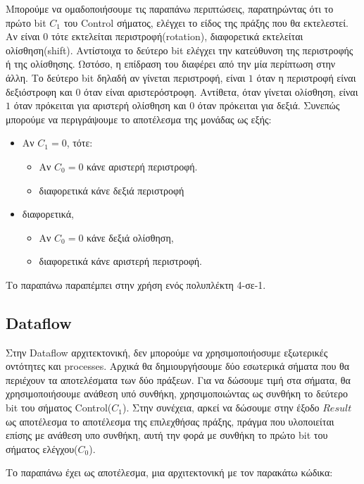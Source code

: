 \documentclass[11pt, a4paper]{report}
\begin{document}
Μπορούμε να ομαδοποιήσουμε τις παραπάνω περιπτώσεις, παρατηρώντας ότι το πρώτο bit $C_1$ του Control σήματος, ελέγχει το είδος της πράξης που θα εκτελεστεί.
Αν είναι $0$ τότε εκτελείται περιστροφή(rotation), διαφορετικά εκτελείται ολίσθηση(shift).
Αντίστοιχα το δεύτερο bit ελέγχει την κατεύθυνση της περιστροφής ή της ολίσθησης. Ωστόσο, η επίδραση του διαφέρει από την μία περίπτωση στην άλλη.
Το δεύτερο bit δηλαδή αν γίνεται περιστροφή, είναι $1$ όταν η περιστροφή είναι δεξιόστροφη και $0$ όταν είναι αριστερόστροφη.
Αντίθετα, όταν γίνεται ολίσθηση, είναι $1$ όταν πρόκειται για αριστερή ολίσθηση και $0$ όταν πρόκειται για δεξιά.
Συνεπώς μπορούμε να περιγράψουμε το αποτέλεσμα της μονάδας ως εξής:
\begin{itemize}
  \item Αν $C_1 = 0$, τότε:
    \begin{itemize}
      \item Αν $C_0 = 0$ κάνε αριστερή περιστροφή.
      \item διαφορετικά κάνε δεξιά περιστροφή
    \end{itemize}
  \item διαφορετικά,
    \begin{itemize}
      \item Αν $C_0 = 0$ κάνε δεξιά ολίσθηση,
      \item διαφορετικά κάνε αριστερή περιστροφή.
    \end{itemize}
\end{itemize}

Το παραπάνω παραπέμπει στην χρήση ενός πολυπλέκτη 4-σε-1.

\subsection{Dataflow}
Στην Dataflow αρχιτεκτονική, δεν μπορούμε να χρησιμοποιήοσυμε εξωτερικές οντότητες και processes.
Αρχικά θα δημιουργήσουμε δύο εσωτερικά σήματα που θα περιέχουν τα αποτελέσματα των δύο πράξεων.
Για να δώσουμε τιμή στα σήματα, θα χρησιμοποιήσουμε ανάθεση υπό συνθήκη, χρησιμοποιώντας ως συνθήκη το δεύτερο bit του σήματος Control($C_1$).
Στην συνέχεια, αρκεί να δώσουμε στην έξοδο $Result$ ως αποτέλεσμα το αποτέλεσμα της επιλεχθήσας πράξης, πράγμα που υλοποιείται επίσης με ανάθεση υπο συνθήκη, αυτή την φορά με συνθήκη το πρώτο bit του σήματος ελέγχου($C_0$).

Το παραπάνω έχει ως αποτέλεσμα, μια αρχιτεκτονική με τον παρακάτω κώδικα:
\inputminted[breaklines, linenos, firstline=12, lastline=30]{vhdl}{./code/part-2/alu-2/alu.vhdl}
\end{document}
